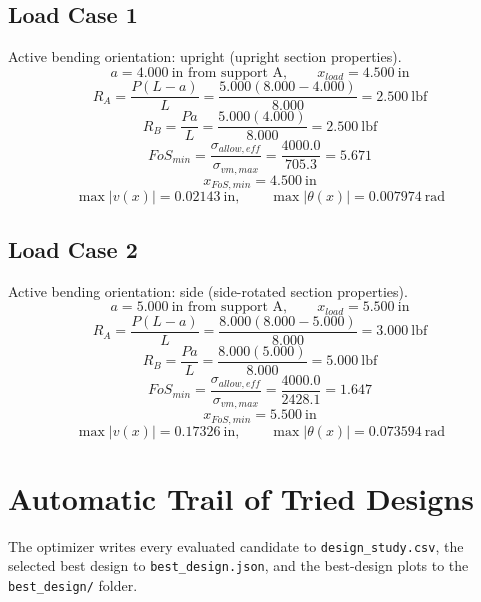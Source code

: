 \documentclass[11pt]{article}
\begin{document}
\subsection*{Load Case 1}
Active bending orientation: upright (upright section properties).
\[a = 4.000\ \mathrm{in} \text{ from support A}, \qquad x_{load} = 4.500\ \mathrm{in}\]
\[R_A = \frac{P(L-a)}{L} = \frac{5.000(8.000-4.000)}{8.000} = 2.500\ \mathrm{lbf}\]
\[R_B = \frac{Pa}{L} = \frac{5.000(4.000)}{8.000} = 2.500\ \mathrm{lbf}\]
\[FoS_{min} = \frac{\sigma_{allow,eff}}{\sigma_{vm,max}} = \frac{4000.0}{705.3} = 5.671\]
\[x_{FoS,min} = 4.500\ \mathrm{in}\]
\[\max |v(x)| = 0.02143\ \mathrm{in}, \qquad \max |\theta(x)| = 0.007974\ \mathrm{rad}\]
\subsection*{Load Case 2}
Active bending orientation: side (side-rotated section properties).
\[a = 5.000\ \mathrm{in} \text{ from support A}, \qquad x_{load} = 5.500\ \mathrm{in}\]
\[R_A = \frac{P(L-a)}{L} = \frac{8.000(8.000-5.000)}{8.000} = 3.000\ \mathrm{lbf}\]
\[R_B = \frac{Pa}{L} = \frac{8.000(5.000)}{8.000} = 5.000\ \mathrm{lbf}\]
\[FoS_{min} = \frac{\sigma_{allow,eff}}{\sigma_{vm,max}} = \frac{4000.0}{2428.1} = 1.647\]
\[x_{FoS,min} = 5.500\ \mathrm{in}\]
\[\max |v(x)| = 0.17326\ \mathrm{in}, \qquad \max |\theta(x)| = 0.073594\ \mathrm{rad}\]

\section*{Automatic Trail of Tried Designs}
The optimizer writes every evaluated candidate to \texttt{design\_study.csv}, the selected best design to \texttt{best\_design.json}, and the best-design plots to the \texttt{best\_design/} folder.
\end{document}
